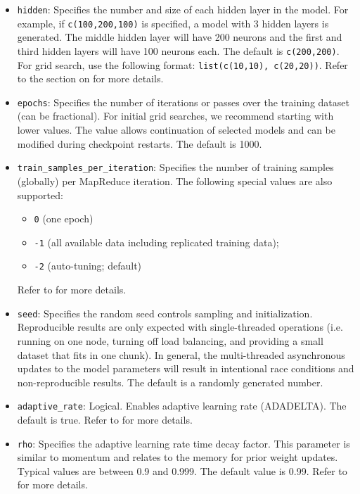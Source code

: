 {{{\begin{itemize}
\item \texttt{hidden}: Specifies the number and size of each hidden layer in the model. For example, if \texttt{c(100,200,100)} is specified, a model with 3 hidden layers is generated. The middle hidden layer will have 200 neurons and the first and third hidden layers will have 100 neurons each. The default is \texttt{c(200,200)}. For grid search, use the following format: \texttt{list(c(10,10), c(20,20))}. Refer to the section on  {\textbf{}} for more details. 

\item \texttt{epochs}: Specifies the number of iterations or passes over the training dataset (can be fractional). For initial grid searches, we recommend starting with lower values. The value allows continuation of selected models and can be modified during checkpoint restarts. The default is 1000.

\item \texttt{train\_samples\_per\_iteration}: Specifies the number of training samples (globally) per MapReduce iteration. The following special values are also supported: 
\begin{itemize}
\item \texttt{0} (one epoch)
\item \texttt{-1} (all available data including replicated training data);
\item \texttt{-2} (auto-tuning; default)
\end{itemize}
Refer to {\textbf{}} for more details.

\item \texttt{seed}: Specifies the random seed controls sampling and initialization. Reproducible results are only expected with single-threaded operations (i.e. running on one node, turning off load balancing, and providing a small dataset that fits in one chunk).  In general, the multi-threaded asynchronous updates to the model parameters will result in intentional race conditions and non-reproducible results.  The default is a randomly generated number.

\item \texttt{adaptive\_rate}: Logical.  Enables adaptive learning rate (ADADELTA). The default is true. Refer to {\textbf{}} for more details.

\item \texttt{rho}: Specifies the adaptive learning rate time decay factor. This parameter is similar to momentum and relates to the memory for prior weight updates. Typical values are between 0.9 and 0.999. The default value is 0.99. %
Refer to {\textbf{}} for more details. 


\end{itemize}}}}

